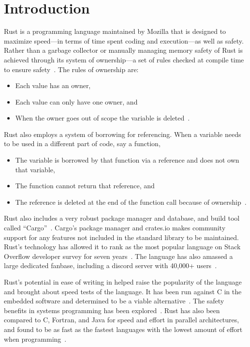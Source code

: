 \documentclass[10pt]{IEEEtran}
\begin{document}
\section{Introduction}
Rust is a programming language maintained by Mozilla that is designed to maximize speed---in terms of time spent coding and 
execution---as well as safety. Rather than a garbage collector or manually managing memory safety of Rust is achieved 
through its system of ownership---a set of rules checked at compile time to ensure safety~\cite{rust2023}. The rules of ownership are:
\begin{itemize}
    \item Each value has an owner,
    \item Each value can only have one owner, and
    \item When the owner goes out of scope the variable is deleted~\cite{rust2023}.
\end{itemize}
Rust also employs a system of borrowing for referencing. When a variable needs to be used in a different part of code, say a function, 
\begin{itemize}
    \item The variable is borrowed by that function via a reference and does not own that variable,
    \item The function cannot return that reference, and
    \item The reference is deleted at the end of the function call because of ownership~\cite{rust2023}.
\end{itemize}
Rust also includes a very robust package manager and database, and build tool called “Cargo”~\cite{cargobook}. 
Cargo's package manager and crates.io makes community support for any features not included in the standard library to be maintained.
Rust's technology has allowed it to rank as the most popular language on Stack Overflow developer survey for seven years~\cite{stackoverflow2022}. 
The language has also amassed a large dedicated fanbase, including a discord server with 40,000+ users~\cite{discord}.
\par
Rust's potential in ease of writing in helped raise the popularity of the language and brought about speed tests of the language. 
It has been run against C in the embedded software and determined to be a viable alternative~\cite{borgsmuller2021rust}. 
The safety benefits in systems programming has been explored~\cite{BalasubramanianProceedings}. 
Rust has also been compared to C, Fortran, and Java for speed and effort in parallel architectures, 
and found to be as fast as the fastest languages with the lowest amount of effort when programming~\cite{costanzo2021performance}\cite{heyman2020comparison}.
\end{document}
